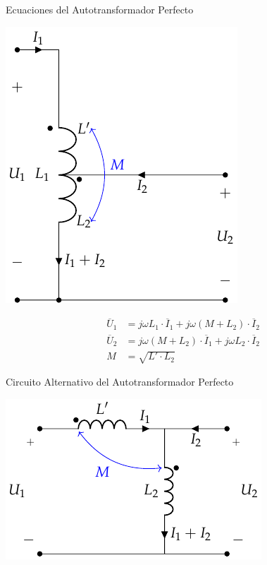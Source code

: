 \documentclass[aspectratio=169, usenames,svgnames,dvipsnames]{beamer}
\begin{document}
\begin{frame}[label={sec:org302faf6}]{Ecuaciones del Autotransformador Perfecto}
\begin{center}
\includegraphics[height=0.6\textheight]{../figs/AutotrafoPerfecto.pdf}
\end{center}
\begin{align*}
  \overline{U}_1 &= j \omega L_1 \cdot \overline{I}_1 + j \omega (M + L_2) \cdot \overline{I}_2\\
  \overline{U}_2 &= j \omega (M + L_2) \cdot \overline{I}_1 + j \omega L_2 \cdot \overline{I}_2\\
  M &= \sqrt{L' \cdot L_2}
\end{align*}
\end{frame}
\begin{frame}[label={sec:orged89107}]{Circuito Alternativo del Autotransformador Perfecto}
\begin{center}
\includegraphics[height=0.8\textheight]{../figs/AutotrafoPerfecto2.pdf}
\end{center}
\end{frame}
\end{document}
